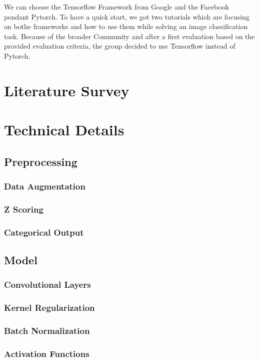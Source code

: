 \documentclass[journal]{IEEEtran}
\begin{document}
\noindent We can choose the Tensorflow Framework from Google and the Facebook pendant Pytorch. To have a quick start, we got two tutorials which are focusing on bothe frameworks and how to use them while solving an image classification task. Because of the broader Community and after a first evaluation based on the provided evaluation criteria, the group decided to use Tensorflow instead of Pytorch.
\section{Literature Survey}
%
%
\section{Technical Details}
\subsection{Preprocessing}
\subsubsection{Data Augmentation}
\subsubsection{Z Scoring}
\subsubsection{Categorical Output}
\subsection{Model}
\subsubsection{Convolutional Layers}
\subsubsection{Kernel Regularization}
\subsubsection{Batch Normalization}
\subsubsection{Activation Functions}
\end{document}
